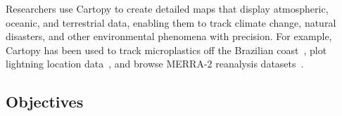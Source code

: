 \documentclass[12pt]{article}
\numberwithin{page}{section}
\begin{document}
Researchers use Cartopy to create detailed maps that display atmospheric, oceanic,
and terrestrial data, enabling them to track climate change, natural disasters,
and other environmental phenomena with precision. For example, Cartopy
has been used to track microplastics off the Brazilian coast~\cite{tracking_microplastics},
plot lightning location data~\cite{lightning_location}, and browse MERRA-2
reanalysis datasets~\cite{merra2_plotting}.



\subsection{Objectives}



%
\end{document}
